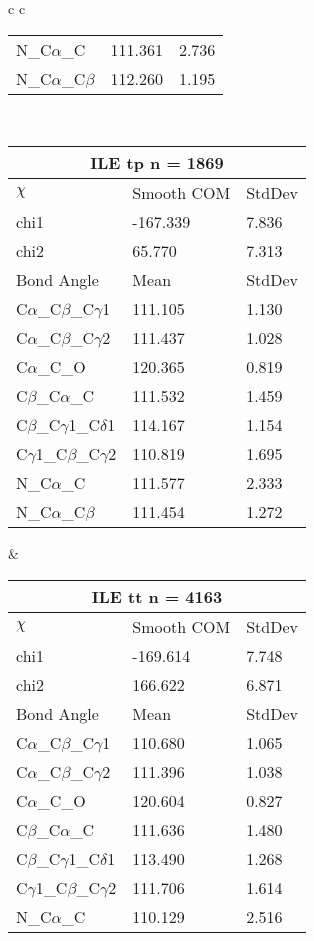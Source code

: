 \begin{longtable}{ c c }
\begin{tabular}{ l l l }
  N\_C$\alpha$\_C & 111.361 & 2.736\\
  N\_C$\alpha$\_C$\beta$ & 112.260 & 1.195\\
  \bottomrule
  \end{tabular}
  \\
  \begin{tabular}{ l l l }
  \toprule
  \multicolumn{3}{c}{ILE \textbf{tp} n = 1869} \\ \toprule
  $\chi$       & Smooth COM & StdDev \\ \midrule
  chi1 & -167.339 & 7.836 \\ 
  chi2 & 65.770 & 7.313 \\ \midrule
  Bond Angle   & Mean     & StdDev \\ \midrule
  C$\alpha$\_C$\beta$\_C$\gamma$1 & 111.105 & 1.130\\
  C$\alpha$\_C$\beta$\_C$\gamma$2 & 111.437 & 1.028\\
  C$\alpha$\_C\_O & 120.365 & 0.819\\
  C$\beta$\_C$\alpha$\_C & 111.532 & 1.459\\
  C$\beta$\_C$\gamma$1\_C$\delta$1 & 114.167 & 1.154\\
  C$\gamma$1\_C$\beta$\_C$\gamma$2 & 110.819 & 1.695\\
  N\_C$\alpha$\_C & 111.577 & 2.333\\
  N\_C$\alpha$\_C$\beta$ & 111.454 & 1.272\\
  \bottomrule
  \end{tabular}
  &
  \begin{tabular}{ l l l }
  \toprule
  \multicolumn{3}{c}{ILE \textbf{tt} n = 4163} \\ \toprule
  $\chi$       & Smooth COM & StdDev \\ \midrule
  chi1 & -169.614 & 7.748 \\ 
  chi2 & 166.622 & 6.871 \\ \midrule
  Bond Angle   & Mean     & StdDev \\ \midrule
  C$\alpha$\_C$\beta$\_C$\gamma$1 & 110.680 & 1.065\\
  C$\alpha$\_C$\beta$\_C$\gamma$2 & 111.396 & 1.038\\
  C$\alpha$\_C\_O & 120.604 & 0.827\\
  C$\beta$\_C$\alpha$\_C & 111.636 & 1.480\\
  C$\beta$\_C$\gamma$1\_C$\delta$1 & 113.490 & 1.268\\
  C$\gamma$1\_C$\beta$\_C$\gamma$2 & 111.706 & 1.614\\
  N\_C$\alpha$\_C & 110.129 & 2.516\\

\end{tabular}
\end{longtable}
